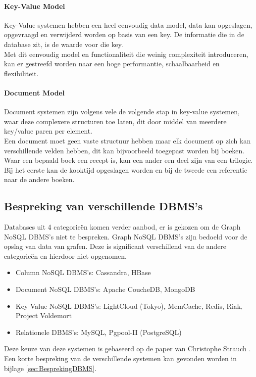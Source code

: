 \paragraph{Key-Value Model} Key-Value systemen hebben een heel eenvoudig data model, data kan opgeslagen, opgevraagd en verwijderd worden op basis van een key. De informatie die in de database zit, is de waarde voor die key. \\
Met dit eenvoudig model en functionaliteit die weinig complexiteit introduceren, kan er gestreefd worden naar een hoge performantie, schaalbaarheid en flexibiliteit. \cite{Strauch.NoSQL}

\paragraph{Document Model} Document systemen zijn volgens vele de volgende stap in key-value systemen, waar deze complexere structuren toe laten, dit door middel van meerdere key/value paren per element. \cite{Strauch.NoSQL} \\
Een document moet geen vaste structuur hebben maar elk document op zich kan verschillende velden hebben, dit kan bijvoorbeeld toegepast worden bij boeken. Waar een bepaald boek een recept is, kan een ander een deel zijn van een trilogie. Bij het eerste kan de kooktijd opgeslagen worden en bij de tweede een referentie naar de andere boeken. \cite{Strauch.NoSQL}


\subsection{Bespreking van verschillende DBMS's}
Databases uit 4 categorieën komen verder aanbod, er is gekozen om de Graph NoSQL DBMS's niet te bespreken. Graph NoSQL DBMS's zijn bedoeld voor de opslag van data van grafen. Deze is significant verschillend van de andere categorieën en hierdoor niet opgenomen. 
 
\begin{itemize}
\item Column NoSQL DBMS's: Cassandra, HBase
\item Document NoSQL DBMS's: Apache CoucheDB, MongoDB
\item Key-Value NoSQL DBMS's: LightCloud (Tokyo), MemCache, Redis, Riak, Project Voldemort
\item Relationele DBMS's: MySQL, Pgpool-II (PostgreSQL)
\end{itemize}

Deze keuze van deze systemen is gebaseerd op de paper van Christophe Strauch \cite{Strauch.NoSQL}. Een korte bespreking van de verschillende systemen kan gevonden worden in bijlage \ref{sec:BesprekingDBMS}.



